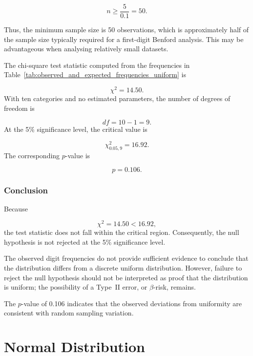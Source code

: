 \begin{equation*}
n \geq \frac{5}{0.1}=50.
\end{equation*}

Thus, the minimum sample size is 50 observations, which is approximately half of the sample size typically required for a first-digit Benford analysis. This may be advantageous when analysing relatively small datasets.

The chi-square test statistic computed from the frequencies in Table~\ref{tab:observed_and_expected_frequencies_uniform} is

\begin{equation*}
\chi^2 = 14.50.
\end{equation*}
With ten categories and no estimated parameters, the number of degrees of freedom is

\begin{equation*}
df = 10-1 = 9.
\end{equation*}
At the 5\% significance level, the critical value is

\begin{equation*}
\chi^2_{0.05,9}=16.92.
\end{equation*}
The corresponding \(p\)-value is

\begin{equation*}
p = 0.106.
\end{equation*}

\subsubsection*{Conclusion}

Because

\begin{equation*}
\chi^2 = 14.50 < 16.92,
\end{equation*}
the test statistic does not fall within the critical region. Consequently, the null hypothesis is not rejected at the 5\% significance level.

The observed digit frequencies do not provide sufficient evidence to conclude that the distribution differs from a discrete uniform distribution. However, failure to reject the null hypothesis should not be interpreted as proof that the distribution is uniform; the possibility of a Type~II error, or $\beta$-risk, remains.

The \(p\)-value of 0.106 indicates that the observed deviations from uniformity are consistent with random sampling variation.

\section{Normal Distribution}

